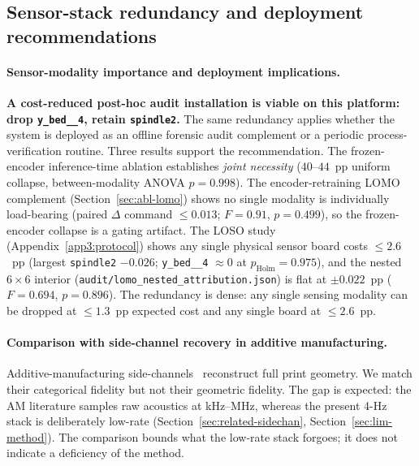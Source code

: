\documentclass[sensors,article,submit,moreauthors,pdftex]{Definitions/mdpi}
\begin{document}
\subsection{Sensor-stack redundancy and deployment recommendations}
\label{sec:disc-deployment-stack}

\paragraph{Sensor-modality importance and deployment implications.}\label{sec:disc-modality}\hspace*{0pt plus 1fill}

\textbf{A cost-reduced post-hoc audit installation is viable on this platform: drop \texttt{y\_bed\_\_4}, retain \texttt{spindle2}.} The same redundancy applies whether the system is deployed as an offline forensic audit complement or a periodic process-verification routine. Three results support the recommendation. The frozen-encoder inference-time ablation establishes \emph{joint necessity} ($40$--$44$~pp uniform collapse, between-modality ANOVA $p\!=\!0.998$). The encoder-retraining LOMO complement (Section~\ref{sec:abl-lomo}) shows no single modality is individually load-bearing (paired $\Delta$ command $\le\!0.013$; $F\!=\!0.91$, $p\!=\!0.499$), so the frozen-encoder collapse is a gating artifact. The LOSO study (Appendix~\ref{app3:protocol}) shows any single physical sensor board costs $\le\!2.6$~pp (largest \texttt{spindle2} $-0.026$; \texttt{y\_bed\_\_4} $\approx\!0$ at $p_{\text{Holm}}\!=\!0.975$), and the nested $6\!\times\!6$ interior (\texttt{audit/lomo\_nested\_attribution.json}) is flat at $\pm0.022$~pp ($F\!=\!0.694$, $p\!=\!0.896$). The redundancy is dense: any single sensing modality can be dropped at $\le\!1.3$~pp expected cost and any single board at $\le\!2.6$~pp.

\paragraph{Comparison with side-channel recovery in additive manufacturing.}\label{sec:disc-comparison-am}\hspace*{0pt plus 1fill}

Additive-manufacturing side-channels~\cite{alfaruque2016acoustic,song2016my,chhetri2016kcad,jamarani2024screg,chattopadhyay2025video} reconstruct full print geometry. We match their categorical fidelity but not their geometric fidelity. The gap is expected: the AM literature samples raw acoustics at kHz--MHz, whereas the present 4-Hz stack is deliberately low-rate (Section~\ref{sec:related-sidechan}, Section~\ref{sec:lim-method}). The comparison bounds what the low-rate stack forgoes; it does not indicate a deficiency of the method.
\end{document}
